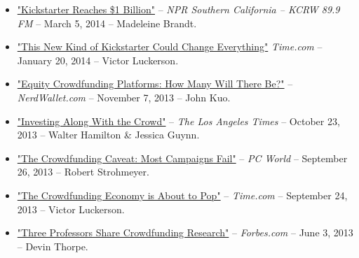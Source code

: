 \documentclass[10.5pt,letterpaper,sans]{moderncv}        %
\begin{document}
\begin{itemize}
\item \textcolor{gray}{\href{http://www.kcrw.com/etc/programs/pp/pp140305vaping_chevron_in_ec}{"Kickstarter Reaches \$1 Billion"}} -- \textit{NPR Southern California -- KCRW 89.9 FM} -- March 5, 2014 -- Madeleine Brandt.

\item \textcolor{gray}{\href{http://business.time.com/2014/01/20/ibm-internal-enterprise-crowdfunding-mimics-kickstarter/}{"This New Kind of Kickstarter Could Change Everything"}} \textit{Time.com} -- January 20, 2014 -- Victor Luckerson.

\item \textcolor{gray}{\href{http://www.nerdwallet.com/blog/investing/2013/equity-crowdfunding-platforms/}{"Equity Crowdfunding Platforms: How Many Will There Be?"}} -- \textit{NerdWallet.com} -- November 7, 2013 -- John Kuo.

\item \textcolor{gray}{\href{http://articles.latimes.com/2013/oct/23/business/la-fi-crowdfunding-20131024}{"Investing Along With the Crowd"}} -- \textit{The Los Angeles Times} -- October 23, 2013 -- Walter Hamilton \& Jessica Guynn.

\item \textcolor{gray}{\href{http://www.pcworld.com/article/2049399/the-crowdfunding-caveat-most-campaigns-fail.html}{"The Crowdfunding Caveat: Most Campaigns Fail"}} -- \textit{PC World} -- September 26, 2013 -- Robert Strohmeyer.

\item \textcolor{gray}{\href{http://business.time.com/2013/09/24/the-crowdfunding-economy-is-about-to-pop/}{"The Crowdfunding Economy is About to Pop"}} -- \textit{Time.com} -- September 24, 2013 -- Victor Luckerson.

\item \textcolor{gray}{\href{http://www.forbes.com/sites/devinthorpe/2013/06/03/three-professors-share-crowdfunding-research-tune-in-to-learn-how-to-make-your-campaign-a-success/}{"Three Professors Share Crowdfunding Research"}} -- \textit{Forbes.com} -- June 3, 2013 -- Devin Thorpe.

\end{itemize}
\end{document}
